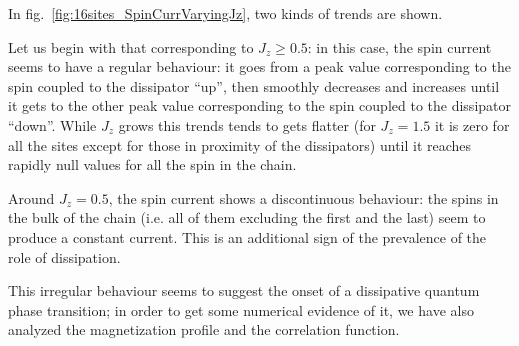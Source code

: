 In fig.~\ref{fig:16sites_SpinCurrVaryingJz}, two kinds of trends are shown. 

Let us begin with that corresponding to $J_z \geq 0.5$: in this case, the spin current seems to have a regular behaviour: it goes from a peak value corresponding to the spin coupled to the dissipator ``up'', then smoothly decreases and increases until it gets to the other peak value corresponding to the spin coupled to the dissipator ``down''. While $J_z$ grows this trends tends to gets flatter (for $J_z = 1.5$ it is zero for all the sites except for those in proximity of the dissipators) until it reaches rapidly null values for all the spin in the chain. 

Around $J_z = 0.5$, the spin current shows a discontinuous behaviour: the spins in the bulk of the chain (i.e. all of them excluding the first and the last) seem to produce a constant current. This is an additional sign of the prevalence of the role of dissipation.


This irregular behaviour seems to suggest the onset of a dissipative quantum phase transition; in order to get some numerical evidence of it, we have also analyzed the magnetization profile and the correlation function.



